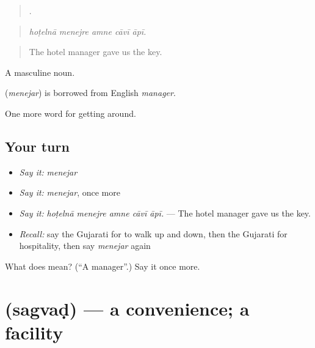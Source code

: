 \begin{quote}
    .
\end{quote}

\begin{quote}
\emph{hoṭelnā menejre amne cāvī āpī.}
\end{quote}

\begin{quote}
The hotel manager gave us the key.
\end{quote}

A masculine noun.

\begin{cousinweb}
\textbf{} (\emph{menejar}) is borrowed from English \emph{manager}.
\end{cousinweb}

\begin{grammarlens}[title={What you've built}]
One more word for getting around.
\end{grammarlens}

\subsection*{Your turn}
\begin{itemize}
\raggedright
  \item \emph{Say it:} \emph{menejar}
  \item \emph{Say it:} \emph{menejar}, once more
  \item \emph{Say it:} \emph{hoṭelnā menejre amne cāvī āpī.} — The hotel manager gave us the key.
  \item \emph{Recall:} say the Gujarati for to walk up and down, then the Gujarati for hospitality, then say \emph{menejar} again
\end{itemize}

\begin{tcolorbox}[breakable,colback=teal!4,colframe=teal!35!black,title={Before you move on}]
What does  mean? (\textquotedblleft{}A manager\textquotedblright{}.) Say it once more.
\end{tcolorbox}
\section[\texorpdfstring{\gu{સગવડ} (sagvaḍ)}{સગવડ (sagvaḍ)}]{ (sagvaḍ) — a convenience; a facility}

\label{lesson:GU-C409-sagvad}



